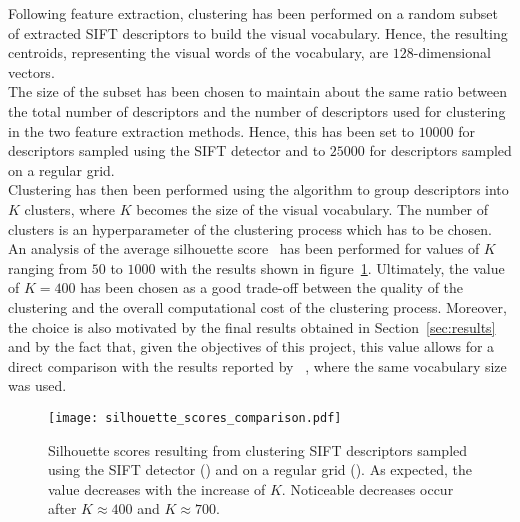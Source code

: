 \documentclass[../main.tex]{subfiles}
\begin{document}
Following feature extraction, clustering has been performed on a random subset
of extracted SIFT descriptors to build the visual vocabulary. Hence, the
resulting centroids, representing the visual words of the vocabulary, are
$128$-dimensional vectors.\\
The size of the subset has been chosen to maintain about the same ratio between the
total number of descriptors and the number of descriptors used for
clustering in the two feature extraction methods. Hence, this has been set to
$\num{10000}$ for descriptors sampled using the SIFT detector and to
$\num{25000}$ for descriptors sampled on a regular grid.\\
Clustering has then been performed using the  algorithm to group
descriptors into $K$ clusters, where $K$ becomes the size of the visual
vocabulary. The number of clusters is an hyperparameter of the
clustering process which has to be chosen. An analysis of the average silhouette
score~\cite{silhouette} has been performed for values of $K$ ranging from $50$
to $1000$ with the results shown in figure~\ref{fig:silhouette-score}.
Ultimately, the value of $K=400$ has been chosen as a good trade-off between the
quality of the clustering and the overall computational cost of the clustering process.
Moreover, the choice is also motivated by the final results obtained in
Section~\ref{sec:results} and by the fact that, given the objectives of
this project, this value allows for a direct comparison with the results
reported by ~\cite{lazebnik}, where the same vocabulary
size was used.
\begin{figure}[htb]
  \centering
  \texttt{[image: silhouette\_scores\_comparison.pdf]}
  \caption{Silhouette scores resulting from
  clustering SIFT descriptors sampled using the SIFT detector ()
and on a regular grid (). As expected, the value decreases with the
increase of $K$. Noticeable decreases occur after $K\approx400$ and $K\approx700$.}
  \label{fig:silhouette-score}
\end{figure}
\end{document}
